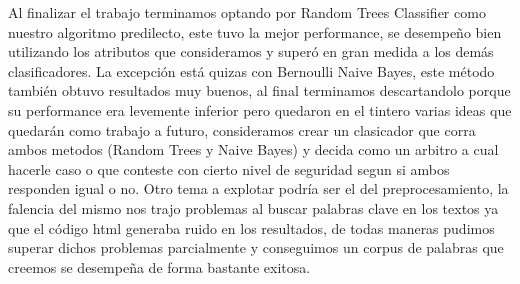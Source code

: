 Al  finalizar el trabajo terminamos optando por Random Trees Classifier como nuestro algoritmo predilecto, este tuvo la mejor performance, se desempeño bien utilizando los atributos que consideramos y superó en gran medida a los demás clasificadores. La excepción está quizas con Bernoulli Naive Bayes, este método también obtuvo resultados muy buenos, al final terminamos descartandolo porque su performance era levemente inferior pero quedaron en el tintero varias ideas que quedarán como trabajo a futuro, consideramos crear un clasicador que corra ambos metodos (Random Trees y Naive Bayes) y decida como un arbitro a cual hacerle caso o que conteste con cierto nivel de seguridad segun si ambos responden igual o no. Otro tema a explotar podría ser el del preprocesamiento, la falencia del mismo nos trajo problemas al buscar palabras clave en los textos ya que el código html generaba ruido en los resultados, de todas maneras pudimos superar dichos problemas parcialmente y conseguimos un corpus de palabras que creemos se desempeña de forma bastante exitosa.